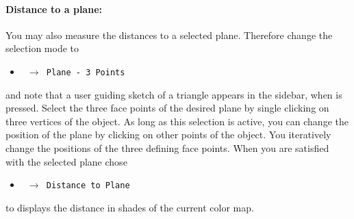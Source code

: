 \vspace{-5mm}
\paragraph{Distance to a plane:}
You may also measure the distances to a selected plane. 
Therefore change the selection mode to
\begin{itemize}
	\item[] \texttt{ $\rightarrow$ Plane - 3 Points}
\end{itemize}
and note that a user guiding sketch of a triangle appears in the sidebar, when  \!\Ctrl is pressed. 
Select the three face points of the desired plane by single clicking on three vertices of the object. 
As long as this selection is active, you can change the position of the plane by clicking on other points of the object. 
You iteratively change the positions of the three defining face points. 
When you are satisfied with the selected plane chose
\begin{itemize}
	\item[] \texttt{ $\rightarrow$ Distance to Plane}
\end{itemize}
to displays the distance in shades of the current color map.

